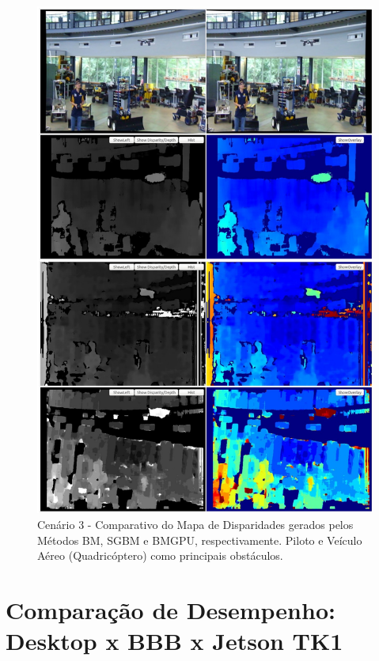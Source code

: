 \begin{figure}[H]
 	\centering
 	\includegraphics[scale=0.35]{./Resources/results/scene3_montage.jpg}
 	\caption{Cenário 3 - Comparativo do Mapa de Disparidades gerados pelos Métodos BM, SGBM e BMGPU, respectivamente. Piloto e Veículo Aéreo (Quadricóptero) como principais obstáculos.}
 	\label{scene3_montage}
\end{figure}

\section{Comparação de Desempenho: Desktop x BBB x Jetson TK1}
\label{resultsComparison}

